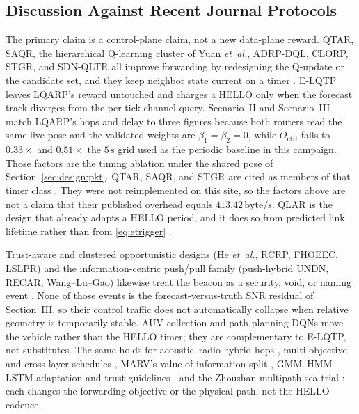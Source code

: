 \subsection{Discussion Against Recent Journal Protocols}
\label{sec:eval:disc}
The primary claim is a control-plane claim, not a new data-plane
reward.
QTAR, SAQR, the hierarchical Q-learning cluster of Yuan
\emph{et~al.}, ADRP-DQL, CLORP, STGR, and SDN-QLTR all improve
forwarding by redesigning the Q-update or the candidate set, and
they keep neighbor state current on a timer
\cite{nandyala2023qtar,zhang2025saqr,yuan2023qhier,mohanraju2025adrp,liu2024clorP,xu2025stgr,li2024sdnqltr}.
E-LQTP leaves LQARP's reward untouched \cite{liu2026lqarp} and
charges a HELLO only when the forecast track diverges from the
per-tick channel query.
Scenario~II and Scenario~III match LQARP's hops and delay to three
figures because both routers read the same live pose and the
validated weights are $\beta_1=\beta_2=0$, while $O_{\mathrm{ctrl}}$
falls to $0.33\times$ and $0.51\times$ the $5\,\mathrm{s}$ grid used
as the periodic baseline in this campaign.
Those factors are the timing ablation under the shared pose of
Section~\ref{sec:design:pkt}.
QTAR, SAQR, and STGR are cited as members of that timer class
\cite{nandyala2023qtar,zhang2025saqr,xu2025stgr}.
They were not reimplemented on this site, so the factors above are
not a claim that their published overhead equals
$413.42\,\mathrm{byte/s}$.
QLAR is the design that already adapts a HELLO period, and it does
so from predicted link lifetime rather than from
\eqref{eq:etrigger} \cite{li2025qlar}.

Trust-aware and clustered opportunistic designs (He \emph{et~al.},
RCRP, FHOEEC, LSLPR) and the information-centric push/pull family
(push-hybrid UNDN, RECAR, Wang--Lu--Gao) likewise treat the beacon
as a security, void, or naming event
\cite{he2025trust,zhu2024rcrp,lee2025fho,tian2023lslpr,wang2024push,li2024recar,wang2025reliable,zhao2026trclor}.
None of those events is the forecast-versus-truth SNR residual of
Section~III, so their control traffic does not automatically
collapse when relative geometry is temporarily stable.
AUV collection and path-planning DQNs
\cite{wang2024lgdqn,liu2025mdqn,lu2025wper,nandyala2025isolated}
move the vehicle rather than the HELLO timer; they are complementary
to E-LQTP, not substitutes.
The same holds for acoustic--radio hybrid hops
\cite{jiang2023hybrid}, multi-objective and cross-layer schedules
\cite{yuan2024multiobj,yuan2024crosslayer}, MARV's value-of-information
split \cite{wang2024marv}, GMM--HMM--LSTM adaptation and trust
guidelines \cite{zhu2024gmmhmm,zhu2024trustcomst}, and the Zhoushan
multipath sea trial \cite{yuan2024multipath}: each changes the
forwarding objective or the physical path, not the HELLO cadence.

